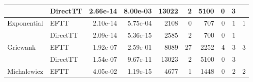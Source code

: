\begin{table}[!ht]
{\begin{tabular}{llrrrrrrrr}
                                           & DirectTT                        & 2.66e-14                    & 8.00e-03                                           & 13022                          & 2                                                   & 5100                          & 0                                                & 3                                        & {}                                       \\ \hline
            \multirow{2}{*}{Exponential}   & EFTT                            & 2.10e-14                    & 5.75e-04                                           & 2108                           & 0                                                   & 707                           & 0                                                & 1                                        & {1}                                      \\ %
                                           & DirectTT                        & 2.09e-14                    & 5.36e-15                                           & 2585                           & 2                                                   & 700                           & 0                                                & 1                                        & {}                                       \\ \hline
            \multirow{2}{*}{Griewank}      & EFTT                            & 1.92e-07                    & 2.59e-01                                           & 8089                           & 27                                                  & 2252                          & 4                                                & 3                                        & {3}                                      \\ %
                                           & DirectTT                        & 1.54e-07                    & 9.67e-11                                           & 13023                          & 2                                                   & 5100                          & 0                                                & 3                                        & {}                                       \\ \hline
            \multirow{2}{*}{Michalewicz}   & EFTT                            & 4.05e-02                    & 1.19e-15                                           & 4677                           & 1                                                   & 1448                          & 0                                                & 2                                        & {2}                                      \\ %

\end{tabular}}
\end{table}
